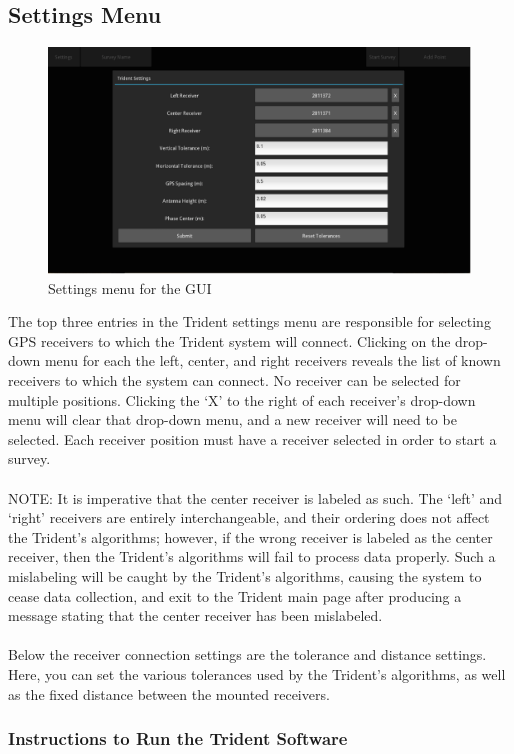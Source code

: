 \documentclass[12pt]{article}
\begin{document}
\subsection{Settings Menu}
\begin{figure}[H]
\centering
\includegraphics[scale=0.5]{blog_posts/GUI_2.png}
\caption{Settings menu for the GUI}
\label{fig:my_label}
\end{figure}
The top three entries in the Trident settings menu are responsible for selecting GPS receivers to which the Trident system will connect. Clicking on the drop-down menu for each the left, center, and right receivers reveals the list of known receivers to which the system can connect. No receiver can be selected for multiple positions. Clicking the ‘X’ to the right of each receiver’s drop-down menu will clear that drop-down menu, and a new receiver will need to be selected. Each receiver position must have a receiver selected in order to start a survey.\\ \\
NOTE: It is imperative that the center receiver is labeled as such. The ‘left’ and ‘right’ receivers are entirely interchangeable, and their ordering does not affect the Trident’s algorithms; however, if the wrong receiver is labeled as the center receiver, then the Trident’s algorithms will fail to process data properly. Such a mislabeling will be caught by the Trident’s algorithms, causing the system to cease data collection, and exit to the Trident main page after producing a message stating that the center receiver has been mislabeled. \\ \\
Below the receiver connection settings are the tolerance and distance settings. Here, you can set the various tolerances used by the Trident’s algorithms, as well as the fixed distance between the mounted receivers.
\subsubsection{Instructions to Run the Trident Software}
\end{document}
